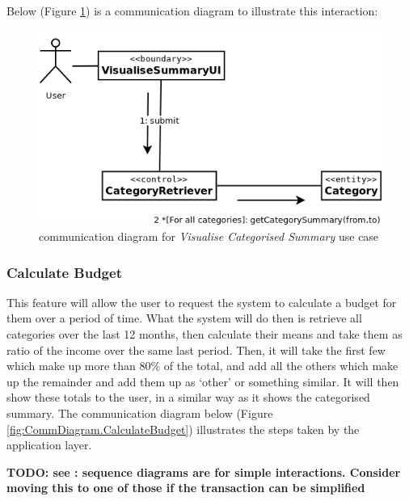 Below (Figure \ref{fig:CommDiagram.VisualiseCategorisedSummary}) is a
communication diagram to illustrate this interaction: 
\begin{figure}[ht!]
  \begin{center}
    \includegraphics[width=12cm]{./contents/img/Comm_Diagram_-_Visualise_Categorised_Summary.png}
  \end{center}
  \caption{communication diagram for \emph{Visualise Categorised Summary} use case}
  \label{fig:CommDiagram.VisualiseCategorisedSummary}
\end{figure}
\FloatBarrier



\subsubsection{Calculate Budget} \label{sec:AnalysisAndDesign.BusinessLogic.CalculateBudget}
This feature will allow the user to request the system to calculate a budget
for them over a period of time. What the system will do then is retrieve all
categories over the last 12 months, then calculate their means and take them as
ratio of the income over the same last period. Then, it will take the first few
which make up more than 80\% of the total, and add all the others which make up
the remainder and add them up as `other' or something similar. It will then
show these totals to the user, in a similar way as it shows the categorised
summary. The communication diagram below (Figure
\ref{fig:CommDiagram.CalculateBudget}) illustrates the steps taken by the
application layer.

\textbf{TODO: see \cite[][p.~262]{bennett2010object}: sequence diagrams are for simple
interactions. Consider moving this to one of those if the transaction can be
simplified}

